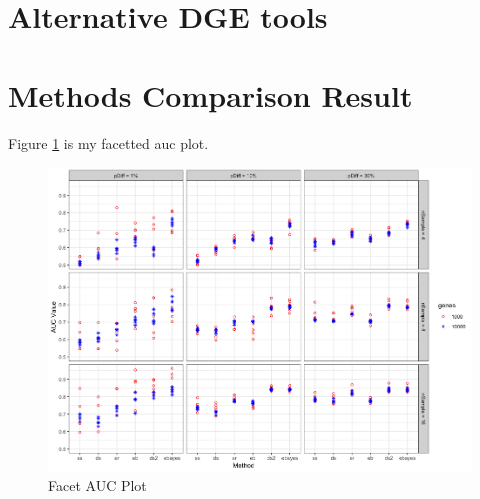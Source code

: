 \documentclass[11pt]{isuthesis}
\begin{document}
\section{Alternative DGE tools}



\section{Methods Comparison Result}

Figure \ref{auc} is my facetted auc plot.

\begin{figure}[h!tb] 
\includegraphics[scale=0.4]{auc_facet_plot}
\caption{Facet AUC Plot}
\label{auc}
\end{figure}



%
%


\renewcommand{\bibname}{\centerline{BIBLIOGRAPHY}}
\unappendixtitle
\newpage
{}


\end{document}
